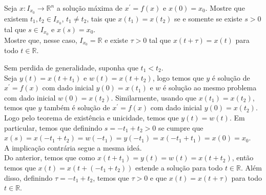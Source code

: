 \begin{homeworkProblem}[1-11]
  Seja $x : I_{x_0} \to \mathbb{R}^n$ a solução máxima de $x^{\prime} = f(x)$ e $x(0) = x_0$. Mostre que existem $t_1,t_2 \in I_{x_0}$, $t_1 \neq t_2$, tais que $x(t_1) = x(t_2)$ se e somente se existe $s>0$ tal que $s\in I_{x_0}$ e $x(s)=x_0$.\\
  Mostre que, nesse caso, $I_{x_0}=\mathbb{R}$ e existe $\tau>0$ tal que $x(t+\tau)=x(t)$ para todo $t\in\mathbb{R}$.
  \begin{solution}
    Sem perdida de generalidade, suponha que $t_1<t_2$.\\
    Seja $y(t)=x(t+t_1)$ e $w(t)=x(t+t_2)$, logo temos que $y$ é solução de $x^{\prime}=f(x)$ com dado inicial $y(0)=x(t_1)$ e $w$ é solução ao mesmo problema com dado inicial $w(0)=x(t_2)$. Similarmente, usando que $x(t_1)=x(t_2)$, temos que $y$ também é solução de $x^{\prime}=f(x)$ com dado inicial $y(0)=x(t_2)$. Logo pelo teorema de existência e unicidade, temos que $y(t)=w(t)$. Em particular, temos que definindo $s=-t_1+t_2>0$ se cumpre que $x(s)=x(-t_1+t_2)=w(-t_1)=y(-t_1)=x(-t_1+t_1)=x(0)=x_0$.\\
    A implicação contrária segue a mesma ideá.\\
    Do anterior, temos que como $x(t+t_1)=y(t)=w(t)=x(t+t_2)$, então temos que $x(t)=x(t+(-t_1+t_2))$ estende a solução para todo $t\in \mathbb{R}$. Além disso, definindo $\tau=-t_1+t_2$, temos que $\tau>0$ e que $x(t)=x(t+\tau)$ para todo $t\in\mathbb{R}$. 
  \end{solution}
\end{homeworkProblem}
